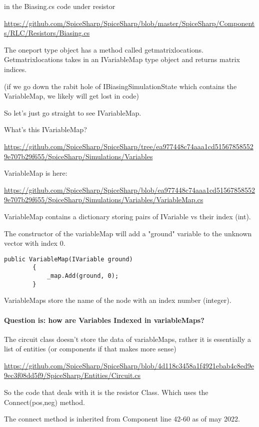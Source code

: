 \documentclass[12pt]{article}
\renewcommand{\_}{\kern-1.5pt\textunderscore\kern-1.5pt}
\begin{document}
in the Biasing.cs code under resistor

\url{https://github.com/SpiceSharp/SpiceSharp/blob/master/SpiceSharp/Components/RLC/Resistors/Biasing.cs}

The oneport type object has a method called getmatrixlocations.
Getmatrixlocations takes in an IVariableMap type object and returns matrix indices.

(if we go down the rabit hole of IBiasingSimulationState which contains the VariableMap, we likely will get lost in code)

So let's just go straight to see IVariableMap.

What's this IVariableMap?

\url{https://github.com/SpiceSharp/SpiceSharp/tree/ea977448c74aaa1cd515678585529e707b29f655/SpiceSharp/Simulations/Variables}

VariableMap is here:

\url{https://github.com/SpiceSharp/SpiceSharp/blob/ea977448c74aaa1cd515678585529e707b29f655/SpiceSharp/Simulations/Variables/VariableMap.cs}

VariableMap contains a dictionary storing pairs of IVariable vs their index (int).

The constructor of the variableMap will add a "ground" variable to the unknown vector with index 0. 

\begin{verbatim}
public VariableMap(IVariable ground)
        {
            _map.Add(ground, 0);
        }
\end{verbatim}

VariableMaps store the name of the node with an index number (integer).

\paragraph{Question is: how are Variables Indexed in variableMaps?}

The circuit class doesn't store the data of variableMaps, rather it is essentially a list of entities (or components if that makes more sense)

\url{https://github.com/SpiceSharp/SpiceSharp/blob/4d118c3458a1f4921ebab4c8ed9e9ec3f08dd5f9/SpiceSharp/Entities/Circuit.cs}

So the code that deals with it is the resistor Class. Which uses the Connect(pos,neg) method.

The connect method is inherited from Component line 42-60 as of may 2022.
\end{document}
